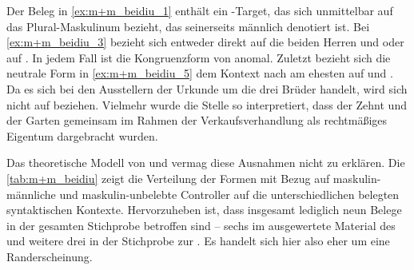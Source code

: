 Der Beleg in \cref{ex:m+m_beidiu_1} enthält ein -Target, das sich
unmittelbar auf das Plural-Maskulinum   bezieht, das
seinerseits männlich denotiert ist.
Bei \cref{ex:m+m_beidiu_3} bezieht sich  entweder direkt auf die
beiden Herren  und 
oder auf  . In jedem Fall ist die Kongruenzform
von  anomal. Zuletzt bezieht sich die neutrale Form  in
\cref{ex:m+m_beidiu_5} dem Kontext nach am ehesten auf
  und  . Da es sich bei
den Ausstellern der Urkunde um die drei Brüder  \autocite[\pno~1201~AB,
472.6--7]{cao2} handelt, wird sich  nicht auf  beziehen.
Vielmehr wurde die Stelle so interpretiert, dass der Zehnt und der Garten
gemeinsam im Rahmen der Verkaufsverhandlung als rechtmäßiges Eigentum
dargebracht wurden.

Das theoretische Modell von \citet{wechsler2009} und \citet{wechslerzlatic2003}
vermag diese Ausnahmen nicht zu erklären. Die \cref{tab:m+m_beidiu} zeigt die
Verteilung der Formen mit Bezug auf maskulin-männliche und maskulin-unbelebte
Controller auf die unterschiedlichen belegten syntaktischen Kontexte.
Hervorzuheben ist, dass insgesamt lediglich neun Belege in der gesamten
Stichprobe betroffen sind -- sechs im ausgewertete Material des \CAO{}
und weitere drei in der Stichprobe zur \citet{kc}. Es handelt sich hier
also eher um eine Randerscheinung.


